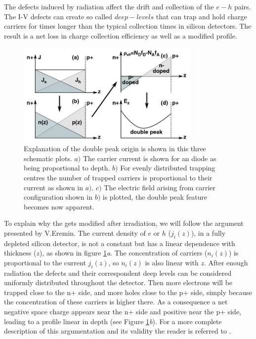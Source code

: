 The defects induced by radiation affect the drift and collection of the $e-h$ pairs. The I-V defects can create so called $deep-levels$ that can trap and hold charge carriers for times longer than the typical collection times in silicon detectors. The result is a net loss in charge collection efficiency as well as a modified \neff profile.

\begin{figure}[H]
	\centering
	\includegraphics[width=0.8\textwidth]{chap3_erem.jpg}
	\caption{Explanation of the double peak origin is shown in this three schematic plots. $a)$ The carrier current is shown for an diode as being proportional to depth. $b)$ For evenly distributed trapping centres the number of trapped carriers is proportional to their current as shown in $a)$. $c)$ The electric field arising from carrier configuration shown in $b)$ is plotted, the double peak feature becomes now apparent.}
	\label{fig:Eremin}
\end{figure}

To explain why the \neff gets modified after irradiation, we will follow the argument presented by V.Eremin\cite{Eremin}. The current density of $e$ or $h$ ($j_i(z)$), in a fully depleted silicon detector, is not a constant but has a linear dependence with thickness ($z$), as shown  in figure \ref{fig:Eremin}\emph{a}. The concentration of carriers ($n_i(z)$) is proportional to the current $j_i(z)$, so $n_i(z)$ is also linear with $z$. After enough radiation the defects and their correspondent deep levels can be considered uniformly distributed throughout the detector. Then more electrons will be trapped close to the n+ side, and more holes close to the p+ side, simply because the concentration of these carriers is higher there. As a consequence a net negative space charge appears near the n+ side and positive near the p+ side, leading to a \neff profile linear in depth (see Figure \ref{fig:Eremin}\emph{b}). For a more complete description of this argumentation and its validity the reader is referred to \cite{Eremin}.


